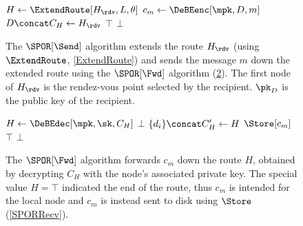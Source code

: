 \begin{figure}
  \begin{algorithmic}
      \State $H\gets \ExtendRoute[H_\rdv, L, \theta]$
      \State $c_m\gets \DeBEenc[\mpk, D, m]$
      \State $D\concat C_H\gets H_\rdv$
          \State \Return $\top$
        \EndIf
      \EndFor
      \State \Return $\bot$
    \EndFunction
  \end{algorithmic}
  \caption{\label{SPORSend}%
    The \(\SPOR[\Send]\) algorithm extends the route \(H_\rdv\) (using 
    \(\ExtendRoute\), \cref{ExtendRoute}) and sends the message \(m\) down the 
    extended route using the \(\SPOR[\Fwd]\) algorithm (\cref{SPORFwd}).
    The first node of \(H_\rdv\) is the rendez-vous point selected by the 
    recipient.
    \(\pk_D\) is the public key of the recipient.
  }
\end{figure}

\begin{figure}
  \begin{algorithmic}
      \State $H\gets \DeBEdec[\mpk, \sk, C_H]$
        \State \Return $\bot$
      \EndIf
      \State $\{d_i\}\concat C_H'\gets H$
        \State \Return $\Store[c_m]$
      \EndIf
          \State \Return $\top$
        \EndIf
      \EndFor
      \State \Return $\bot$
    \EndFunction
  \end{algorithmic}
  \caption{\label{SPORFwd}%
    The \(\SPOR[\Fwd]\) algorithm forwards \(c_m\) down the route \(H\), 
    obtained by decrypting \(C_H\) with the node's associated private key.%
    The special value \(H = \top\) indicated the end of the route, thus \(c_m\) 
    is intended for the local node and \(c_m\) is instead sent to disk using 
    \(\Store\) (\cref{SPORRecv}).%
  }
\end{figure}


